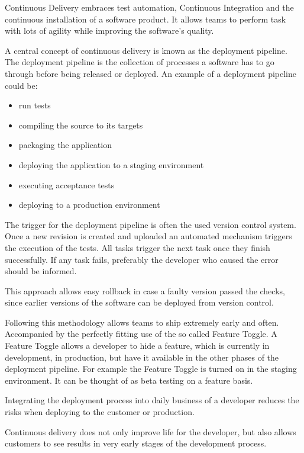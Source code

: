 Continuous Delivery embraces test automation, Continuous Integration and the
continuous installation of a software product. It allows teams to perform task
with lots of agility while improving the software's quality.

A central concept of continuous delivery is known as the deployment pipeline.
The deployment pipeline is the collection of processes a software has to go
through before being released or deployed. An example of a deployment pipeline
could be: 

\begin{itemize}
  \item{run tests}
  \item{compiling the source to its targets}
  \item{packaging the application}
  \item{deploying the application to a staging environment}
  \item{executing acceptance tests}
  \item{deploying to a production environment}
\end{itemize}

The trigger for the deployment pipeline is often the used version control
system. Once a new revision is created and uploaded an automated mechanism
triggers the execution of the tests. All tasks trigger the next task once they
finish successfully. If any task fails, preferably the developer who caused the
error should be informed.

This approach allows easy rollback in case a faulty version passed the checks,
since earlier versions of the software can be deployed from version control.

Following this methodology allows teams to ship extremely early and often.
Accompanied by the perfectly fitting use of the so called Feature Toggle. A
Feature Toggle allows a developer to hide a feature, which is currently in
development, in production, but have it available in the other phases of the
deployment pipeline. For example the Feature Toggle is turned on in the staging
environment. It can be thought of as beta testing on a feature basis.

Integrating the deployment process into daily business of a developer reduces
the risks when deploying to the customer or production.

Continuous delivery does not only improve life for the developer, but also
allows customers to see results in very early stages of the development
process.

